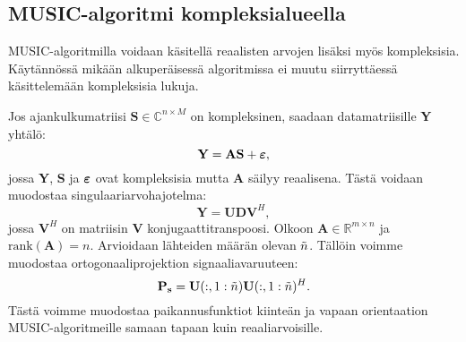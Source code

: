 \subsection{MUSIC-algoritmi kompleksialueella}

MUSIC-algoritmilla voidaan käsitellä reaalisten arvojen lisäksi myös kompleksisia. Käytännössä mikään alkuperäisessä algoritmissa ei muutu siirryttäessä käsittelemään kompleksisia lukuja.

Jos ajankulkumatriisi $\mathbf{S}\in \mathbb{C}^{n\times M}$ on kompleksinen, saadaan datamatriisille \textbf{Y} yhtälö:
\begin{equation}
    \mathbf{Y = AS}+\text{\boldmath{$\varepsilon$}},
\end{equation}
jossa \textbf{Y}, \textbf{S} ja $\text{\boldmath{$\varepsilon$}}$ ovat kompleksisia mutta \textbf{A} säilyy reaalisena. Tästä voidaan muodostaa singulaariarvohajotelma:
\begin{equation}
    \mathbf{Y = UDV}^H,
\end{equation}
jossa $\mathbf{V}^H$ on matriisin \textbf{V} konjugaattitranspoosi. Olkoon $\mathbf{A}\in \mathbb{R}^{m\times n}$ ja $\text{rank}(\mathbf{A})=n$. Arvioidaan lähteiden määrän olevan $\Tilde{n}$. Tällöin voimme muodostaa ortogonaaliprojektion signaaliavaruuteen:
\begin{equation}
    \mathbf{P_s = U}(:,1:\Tilde{n})\mathbf{U}(:,1:\Tilde{n})^H.
\end{equation}
Tästä voimme muodostaa paikannusfunktiot kiinteän ja vapaan orientaation MUSIC-algoritmeille samaan tapaan kuin reaaliarvoisille. 